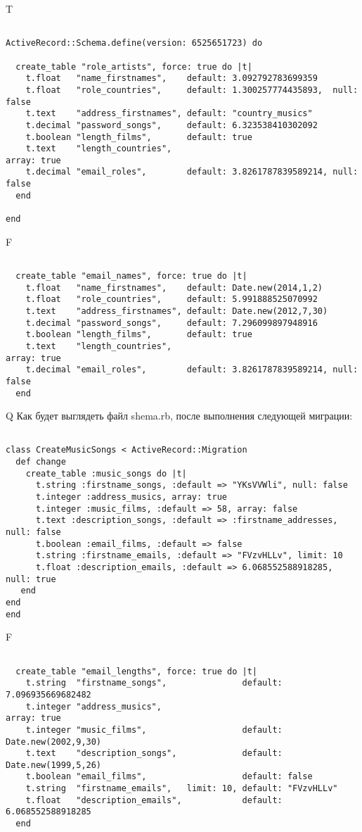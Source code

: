 T
\begin{verbatim}

ActiveRecord::Schema.define(version: 6525651723) do

  create_table "role_artists", force: true do |t|
    t.float   "name_firstnames",    default: 3.092792783699359
    t.float   "role_countries",     default: 1.300257774435893,  null: false
    t.text    "address_firstnames", default: "country_musics"
    t.decimal "password_songs",     default: 6.323538410302092
    t.boolean "length_films",       default: true
    t.text    "length_countries",                                             array: true
    t.decimal "email_roles",        default: 3.8261787839589214, null: false
  end

end
\end{verbatim}


F
\begin{verbatim}

  create_table "email_names", force: true do |t|
    t.float   "name_firstnames",    default: Date.new(2014,1,2)
    t.float   "role_countries",     default: 5.991888525070992
    t.text    "address_firstnames", default: Date.new(2012,7,30)
    t.decimal "password_songs",     default: 7.296099897948916
    t.boolean "length_films",       default: true
    t.text    "length_countries",                                             array: true
    t.decimal "email_roles",        default: 3.8261787839589214, null: false
  end

\end{verbatim}

Q
Как будет выглядеть файл shema.rb, после выполнения следующей миграции:

\begin{verbatim}

class CreateMusicSongs < ActiveRecord::Migration 
  def change 
    create_table :music_songs do |t| 
      t.string :firstname_songs, :default => "YKsVVWli", null: false
      t.integer :address_musics, array: true
      t.integer :music_films, :default => 58, array: false
      t.text :description_songs, :default => :firstname_addresses, null: false
      t.boolean :email_films, :default => false
      t.string :firstname_emails, :default => "FVzvHLLv", limit: 10
      t.float :description_emails, :default => 6.068552588918285, null: true
   end
end
end
\end{verbatim}

F
\begin{verbatim}

  create_table "email_lengths", force: true do |t|
    t.string  "firstname_songs",               default: 7.096935669682482
    t.integer "address_musics",                                                             array: true
    t.integer "music_films",                   default: Date.new(2002,9,30)
    t.text    "description_songs",             default: Date.new(1999,5,26)
    t.boolean "email_films",                   default: false
    t.string  "firstname_emails",   limit: 10, default: "FVzvHLLv"
    t.float   "description_emails",            default: 6.068552588918285
  end

\end{verbatim}

